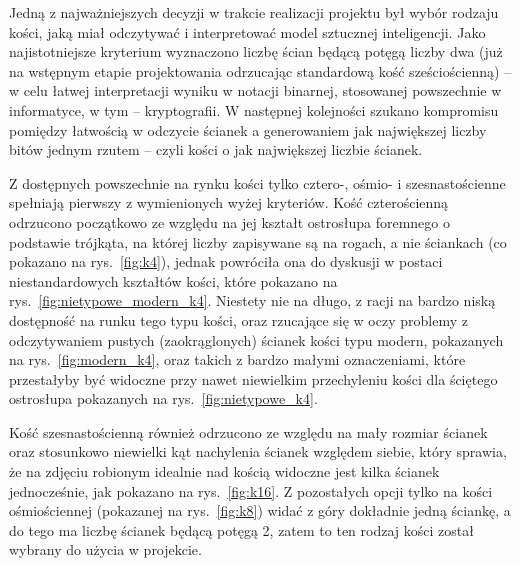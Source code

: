 Jedną z najważniejszych decyzji w trakcie realizacji projektu był wybór rodzaju kości, jaką miał odczytywać
i interpretować model sztucznej inteligencji.
Jako najistotniejsze kryterium wyznaczono liczbę ścian będącą potęgą liczby dwa
(już na wstępnym etapie projektowania odrzucając standardową kość sześciościenną) --
w celu łatwej interpretacji wyniku w notacji binarnej, stosowanej powszechnie w informatyce, w tym -- kryptografii.
W następnej kolejności szukano kompromisu pomiędzy łatwością w odczycie ścianek a generowaniem jak największej liczby
bitów jednym rzutem -- czyli kości o jak największej liczbie ścianek.

Z dostępnych powszechnie na rynku kości tylko cztero-, ośmio- i szesnastościenne spełniają pierwszy z wymienionych wyżej kryteriów.
Kość czterościenną odrzucono początkowo ze względu na jej kształt ostrosłupa foremnego o podstawie trójkąta,
na której liczby zapisywane są na rogach, a nie ściankach (co pokazano na rys.~\ref{fig:k4}),
jednak powróciła ona do dyskusji w postaci niestandardowych kształtów kości, które pokazano na rys.~\ref{fig:nietypowe_modern_k4}.
Niestety nie na długo, z racji na bardzo niską dostępność na runku tego typu kości, oraz rzucające się w oczy problemy
z odczytywaniem pustych (zaokrąglonych) ścianek kości typu modern, pokazanych na rys.~\ref{fig:modern_k4},
oraz takich z bardzo małymi oznaczeniami, które przestałyby być widoczne przy nawet niewielkim przechyleniu kości
dla ściętego ostrosłupa pokazanych na rys.~\ref{fig:nietypowe_k4}.

Kość szesnastościenną również odrzucono ze względu na mały rozmiar ścianek oraz stosunkowo niewielki kąt nachylenia ścianek względem siebie,
który sprawia, że na zdjęciu robionym idealnie nad kością widoczne jest kilka ścianek jednocześnie, jak pokazano na rys.~\ref{fig:k16}.
Z pozostałych opcji tylko na kości ośmiościennej (pokazanej na rys.~\ref{fig:k8}) widać z góry dokładnie jedną ściankę,
a do tego ma liczbę ścianek będącą potęgą 2, zatem to ten rodzaj kości został wybrany do użycia w projekcie.

